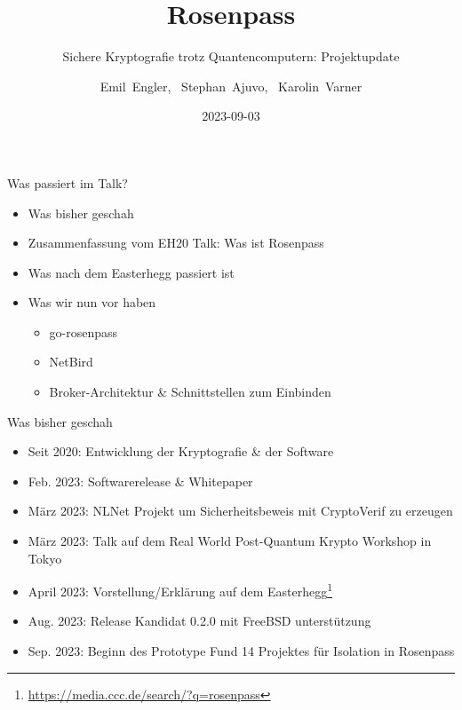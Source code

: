 \documentclass{rosenpass-beamer}
\date{2023-09-03}
\title{Rosenpass}
\subtitle{
  Sichere Kryptografie trotz Quantencomputern: Projektupdate
}
\author{Emil~Engler, \ Stephan~Ajuvo, \ Karolin~Varner}
\begin{document}
\maketitle

		
\begin{frame}{Was passiert im Talk?}
\begin{itemize}
  \item Was bisher geschah
  \item Zusammenfassung vom EH20 Talk: Was ist Rosenpass
  \item Was nach dem Easterhegg passiert ist
  \item Was wir nun vor haben
    \begin{itemize}
      \item go-rosenpass
      \item NetBird
      \item Broker-Architektur \& Schnittstellen zum Einbinden
    \end{itemize}
\end{itemize}
\end{frame}

\begin{frame}{Was bisher geschah}
  \begin{itemize}
    \item Seit 2020: Entwicklung der Kryptografie \& der Software
    \item Feb. 2023: Softwarerelease \& Whitepaper
    \item März 2023: NLNet Projekt um Sicherheitsbeweis mit CryptoVerif zu erzeugen
    \item März 2023: Talk auf dem Real World Post-Quantum Krypto Workshop in Tokyo
    \item April 2023: Vorstellung/Erklärung auf dem Easterhegg\footnote{\url{https://media.ccc.de/search/?q=rosenpass}}
    \item Aug. 2023: Release Kandidat 0.2.0 mit FreeBSD unterstützung
    \item Sep. 2023: Beginn des Prototype Fund 14 Projektes für Isolation in Rosenpass
  \end{itemize}
\end{frame}
\end{document}
